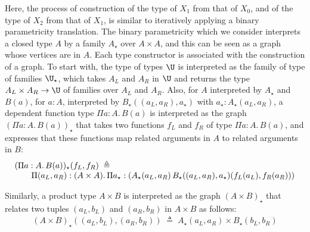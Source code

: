 \documentclass{art.cls/art}
\newcommand{\defeq}{\ensuremath{\triangleq}}
\newcommand{\kstar}{{\star}}
\begin{document}
Here, the process of construction of the type of $X_1$ from that of $X_0$, and of the type of $X_2$ from that of $X_1$, is similar to iteratively applying a binary parametricity translation. The binary parametricity which we consider interprets a closed type $A$ by a family $A_\kstar$ over $A \times A$, and this can be seen as a graph whose vertices are in $A$. Each type constructor is associated with the construction of a graph. To start with, the type of types $\U$ is interpreted as the family of type of families ${\U}_\kstar$, which takes $A_L$ and $A_R$ in $\U$ and returns the type $A_L \times A_R \rightarrow \U$ of families over $A_L$ and $A_R$. Also, for $A$ interpreted by $A_\kstar$ and $B(a)$, for $a:A$, interpreted by $B_\kstar((a_L,a_R),a_\kstar)$ with $a_\kstar:A_\kstar(a_L,a_R)$, a dependent function type $\Pi a: A.\, B(a)$ is interpreted as the graph $(\Pi a: A.\, B(a))_\kstar$ that takes two functions $f_L$ and $f_R$ of type $\Pi a: A.\, B(a)$, and expresses that these functions map related arguments in $A$ to related arguments in $B$:
\begin{equation*}
  \begin{array}{l}
    (\Pi a: A.\, B(a))_\kstar(f_L,f_R) \; \defeq \\
    \multicolumn{1}{r}{\qquad\Pi (a_L,a_R): (A \times A).\, \Pi a_\kstar: (A_\kstar(a_L,a_R)\, B_\kstar((a_L,a_R),a_\kstar)(f_L(a_L),f_R(a_R)))}
  \end{array}
\end{equation*}

Similarly, a product type $A \times B$ is interpreted as the graph $(A \times B)_\kstar$ that relates two tuples $(a_L,b_L)$ and $(a_R,b_R)$ in $A \times B$ as follows:
\begin{align*}
  (A \times B)_\kstar((a_L,b_L),(a_R,b_R)) \; \defeq \; A_\kstar(a_L,a_R) \times B_\kstar(b_L,b_R)
\end{align*}
\end{document}
